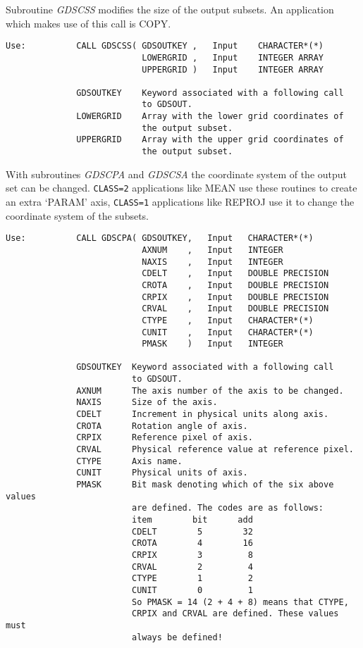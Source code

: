 Subroutine {\sl GDSCSS\/} modifies the size of the output subsets. An
application which makes use of this call is COPY.

\begin{verbatim}
Use:          CALL GDSCSS( GDSOUTKEY ,   Input    CHARACTER*(*)
                           LOWERGRID ,   Input    INTEGER ARRAY
                           UPPERGRID )   Input    INTEGER ARRAY

              GDSOUTKEY    Keyword associated with a following call
                           to GDSOUT.
              LOWERGRID    Array with the lower grid coordinates of
                           the output subset.
              UPPERGRID    Array with the upper grid coordinates of
                           the output subset.
\end{verbatim}

With subroutines {\sl GDSCPA\/} and {\sl GDSCSA\/} the coordinate system
of the output set can be changed.  {\tt CLASS=2} applications like MEAN
use these routines to create an extra `PARAM' axis, {\tt CLASS=1}
applications like REPROJ use it to change the coordinate system of the
subsets.

\begin{verbatim}
Use:          CALL GDSCPA( GDSOUTKEY,   Input   CHARACTER*(*)
                           AXNUM    ,   Input   INTEGER
                           NAXIS    ,   Input   INTEGER
                           CDELT    ,   Input   DOUBLE PRECISION
                           CROTA    ,   Input   DOUBLE PRECISION
                           CRPIX    ,   Input   DOUBLE PRECISION
                           CRVAL    ,   Input   DOUBLE PRECISION
                           CTYPE    ,   Input   CHARACTER*(*)
                           CUNIT    ,   Input   CHARACTER*(*)
                           PMASK    )   Input   INTEGER

              GDSOUTKEY  Keyword associated with a following call
                         to GDSOUT.
              AXNUM      The axis number of the axis to be changed.
              NAXIS      Size of the axis.
              CDELT      Increment in physical units along axis.
              CROTA      Rotation angle of axis.
              CRPIX      Reference pixel of axis.
              CRVAL      Physical reference value at reference pixel.
              CTYPE      Axis name.
              CUNIT      Physical units of axis.
              PMASK      Bit mask denoting which of the six above values
                         are defined. The codes are as follows:
                         item        bit      add
                         CDELT        5        32
                         CROTA        4        16
                         CRPIX        3         8
                         CRVAL        2         4
                         CTYPE        1         2
                         CUNIT        0         1
                         So PMASK = 14 (2 + 4 + 8) means that CTYPE,
                         CRPIX and CRVAL are defined. These values must
                         always be defined!
\end{verbatim}


